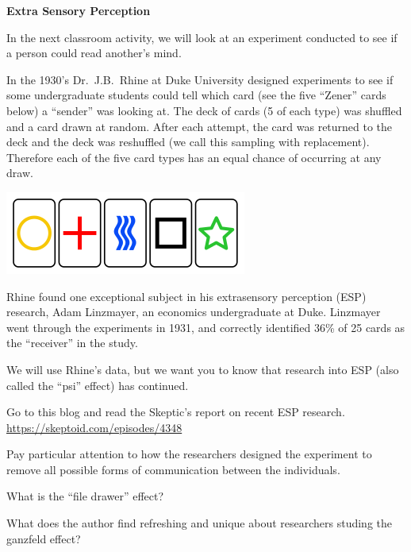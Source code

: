 \def\theTopic{Reading 4}


\begin{center}
{\bf {\large Extra Sensory Perception}}
\end{center}

In the next classroom activity, we will look at an experiment conducted to see
if a person could read another's mind. 

 In the 1930's Dr.~J.B.~Rhine at Duke University designed experiments
to see if some undergraduate students could tell which card (see the
five ``Zener'' cards below) a ``sender'' was looking at. The deck of
cards (5 of each type) was shuffled and a card drawn at random. After
each attempt, the card was returned to the deck and the deck was
reshuffled (we call this sampling with replacement).  Therefore each
of the five card types has an equal chance of occurring at any draw.
\begin{center}
  \includegraphics[width=.5\linewidth]{../plots/Zener_cards.png}
\end{center}

 Rhine found one exceptional subject in his extrasensory perception
 (ESP) research, Adam Linzmayer, an economics undergraduate at Duke.
 Linzmayer went through the experiments in 1931, and correctly
 identified 36\% of 25 cards as the ``receiver'' in the study. 

We will use Rhine's data, but we want you to know that research into ESP
(also called the ``psi'' effect) has continued.

  Go to this blog and read the Skeptic's report on recent ESP
  research.\\
  \url{https://skeptoid.com/episodes/4348}\vspace{1cm}


  Pay particular attention to how the researchers designed the
  experiment to remove all possible forms of communication between the
  individuals.  \vspace{1cm}


  What is the ``file drawer'' effect?\vspace{1cm}

  What does the author find refreshing and unique about researchers
  studing the ganzfeld effect?\vspace{1cm}



